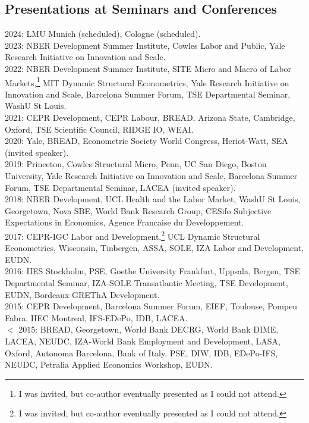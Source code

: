 \documentclass[12pt,english]{article}
\begin{document}
\subsection*{Presentations at Seminars and Conferences}
2024:  LMU Munich (scheduled), Cologne (scheduled). \vspace{0.2cm} \\
2023: NBER Development Summer Institute, Cowles Labor and Public, Yale Research Initiative on Innovation and Scale.\vspace{0.2cm} \\
2022: NBER Development Summer Institute, SITE Micro and Macro of Labor Markets,\footnote{I was invited, but co-author eventually presented as I could not attend.} MIT Dynamic Structural Econometrics, Yale Research Initiative on Innovation and Scale, Barcelona Summer Forum, TSE Departmental Seminar, WashU St Louis.\vspace{0.2cm} \\
2021: CEPR Development, CEPR Labour, BREAD, Arizona State, Cambridge, Oxford, TSE Scientific Council, RIDGE IO, WEAI.\vspace{0.2cm} \\
2020: Yale, BREAD, Econometric Society World Congress, Heriot-Watt, SEA (invited speaker). \vspace{0.2cm} \\
2019: Princeton, Cowles Structural Micro, Penn, UC San Diego, Boston University, Yale Research Initiative on Innovation and Scale, Barcelona Summer Forum, TSE Departmental Seminar, LACEA (invited speaker).\vspace{0.2cm} \\
2018: NBER Development, UCL Health and the Labor Market, WashU St Louis, Georgetown, Nova SBE, World Bank Research Group, CESifo Subjective Expectations in Economics, Agence Francaise du Developpement. \vspace{0.2cm} \\
2017: CEPR-IGC Labor and Development,\footnote{I was invited, but co-author eventually presented as I could not attend.} UCL Dynamic Structural Econometrics, Wisconsin, Tinbergen, ASSA, SOLE, IZA Labor and Development, EUDN.\vspace{0.2cm} \\
2016: IIES Stockholm, PSE, Goethe University Frankfurt, Uppsala, Bergen, TSE Departmental Seminar, IZA-SOLE Transatlantic Meeting, TSE Development, EUDN, Bordeaux-GREThA Development.\vspace{0.2cm} \\
2015:  CEPR Development, Barcelona Summer Forum, EIEF, Toulouse, Pompeu Fabra, HEC Montreal, IFS-EDePo, IDB, LACEA.  \vspace{0.2cm} \\
$<$ 2015: BREAD, Georgetown, World Bank DECRG, World Bank DIME, LACEA, NEUDC, IZA-World Bank Employment and Development, LASA, Oxford, Autonoma Barcelona, Bank of Italy, PSE, DIW, IDB, EDePo-IFS, NEUDC, Petralia Applied Economics Workshop, EUDN.  
\end{document}
